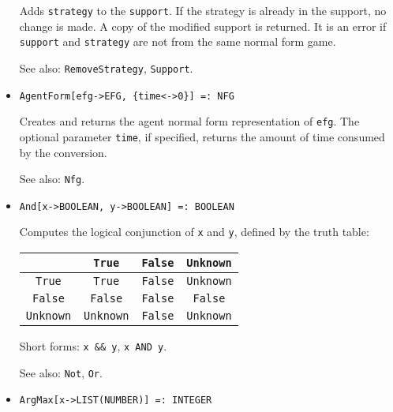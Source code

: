 \begin{itemize}
\bd
Adds \verb+strategy+ to the \verb+support+.  If the strategy is already
in the support, no change is made.  A copy of the modified support is
returned.  It is an error if \verb+support+ and \verb+strategy+ are not
from the same normal form game.

\item [See also:] \verb+RemoveStrategy+, \verb+Support+.
\ed

\item{}
\protect \large \begin{verbatim}
AgentForm[efg->EFG, {time<->0}] =: NFG 
\end{verbatim}\normalsize

\bd
Creates and returns the agent normal form representation of \verb+efg+.
The optional parameter \verb+time+, if specified, returns the amount
of time consumed by the conversion.

\item [See also:] \verb+Nfg+.
\ed

\item{} 
\protect \large \begin{verbatim}
And[x->BOOLEAN, y->BOOLEAN] =: BOOLEAN 
\end{verbatim} \normalsize

\bd
Computes the logical conjunction of \verb+x+ and \verb+y+, defined by the
truth table:
\begin{center}
\begin{tabular} {|c||c|c|c|} \hline
& \verb+True+ & \verb+False+ & \verb+Unknown+ \\ \hline 
\verb+True+ & \verb+True+ & \verb+False+ & \verb+Unknown+ \\
\verb+False+ & \verb+False+ & \verb+False+ & \verb+False+ \\
\verb+Unknown+ & \verb+Unknown+ & \verb+False+ & \verb+Unknown+ \\ \hline
\end{tabular}
\end{center}

\item [Short forms:] \verb+x && y+, \verb+x AND y+.
\item [See also:] \verb+Not+, \verb+Or+.
\ed



\item{} 
\protect \large \begin{verbatim}
ArgMax[x->LIST(NUMBER)] =: INTEGER 
\end{verbatim} \normalsize


\end{itemize}
